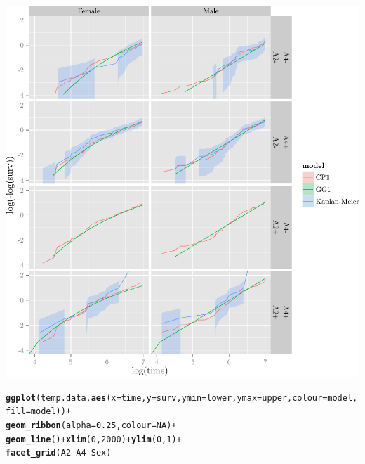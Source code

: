 \documentclass{article}\usepackage[]{graphicx}\usepackage[]{color}
\makeatletter
\def\maxwidth{ %
  \ifdim\Gin@nat@width>\linewidth
    \linewidth
  \else
    \Gin@nat@width
  \fi
}
\newcommand{\hlnum}[1]{\textcolor[rgb]{0.686,0.059,0.569}{#1}}%
\newcommand{\hlopt}[1]{\textcolor[rgb]{0,0,0}{#1}}%
\newcommand{\hlstd}[1]{\textcolor[rgb]{0.345,0.345,0.345}{#1}}%
\newcommand{\hlkwc}[1]{\textcolor[rgb]{0.333,0.667,0.333}{#1}}%
\newcommand{\hlkwd}[1]{\textcolor[rgb]{0.737,0.353,0.396}{\textbf{#1}}}%
\newenvironment{kframe}{%
 \def\at@end@of@kframe{}%
 \ifinner\ifhmode%
  \def\at@end@of@kframe{\end{minipage}}%
  \begin{minipage}{\columnwidth}%
 \fi\fi%
 \def\FrameCommand##1{\hskip\@totalleftmargin \hskip-\fboxsep
 \colorbox{shadecolor}{##1}\hskip-\fboxsep
     \hskip-\linewidth \hskip-\@totalleftmargin \hskip\columnwidth}%
 \MakeFramed {\advance\hsize-\width
   \@totalleftmargin\z@ \linewidth\hsize
   \@setminipage}}%
 {\par\unskip\endMakeFramed%
 \at@end@of@kframe}
\newenvironment{knitrout}{}{} %
\makeatother
\begin{document}
\begin{knitrout}
\begin{kframe}
{\ttfamily\noindent\color{warningcolor}{\#\# Warning: Removed 41 rows containing missing values (geom\_path).}}

{\ttfamily\noindent\color{warningcolor}{\#\# Warning: Removed 39 rows containing missing values (geom\_path).}}\end{kframe}

{\centering \includegraphics[width=\maxwidth]{figure/05-final-fit-assessment-4-1} 

}


\begin{kframe}\begin{alltt}
\hlkwd{ggplot}\hlstd{(temp.data,} \hlkwd{aes}\hlstd{(}\hlkwc{x} \hlstd{= time,} \hlkwc{y} \hlstd{= surv,} \hlkwc{ymin} \hlstd{= lower,} \hlkwc{ymax} \hlstd{= upper,} \hlkwc{colour} \hlstd{= model,} \hlkwc{fill} \hlstd{= model))} \hlopt{+}
        \hlkwd{geom_ribbon}\hlstd{(}\hlkwc{alpha} \hlstd{=} \hlnum{0.25}\hlstd{,} \hlkwc{colour} \hlstd{=} \hlnum{NA}\hlstd{)} \hlopt{+}
        \hlkwd{geom_line}\hlstd{()} \hlopt{+} \hlkwd{xlim}\hlstd{(}\hlnum{0}\hlstd{,} \hlnum{2000}\hlstd{)} \hlopt{+} \hlkwd{ylim}\hlstd{(}\hlnum{0}\hlstd{,} \hlnum{1}\hlstd{)} \hlopt{+}
        \hlkwd{facet_grid}\hlstd{(A2} \hlopt{~} \hlstd{A4} \hlopt{~} \hlstd{Sex)}
\end{alltt}



\end{kframe}
\end{knitrout}
\end{document}
